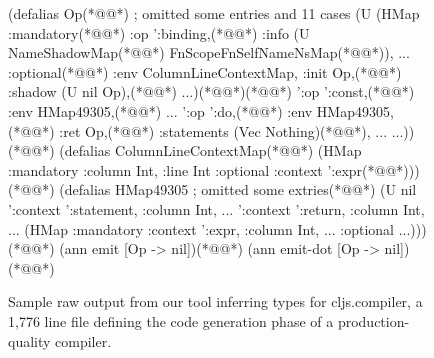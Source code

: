 \begin{figure}
\begin{cljlistingnumbered}
  (defalias Op(*@\label{infer:listing:cljs:Op}@*) ; omitted some entries and 11 cases
    (U (HMap :mandatory(*@\label{infer:listing:cljs:Op:op:bindingStart}@*)
             {:op ':binding,(*@\label{infer:listing:cljs:Op:op:binding}@*) :info (U NameShadowMap(*@\label{infer:listing:cljs:Op:op:binding:NameShadowMap}@*) FnScopeFnSelfNameNsMap(*@\label{infer:listing:cljs:Op:op:binding:FnScopeFnSelfNameNsMap}@*)), ...}
             :optional(*@\label{infer:listing:cljs:Op:optional}@*)
             {:env ColumnLineContextMap, :init Op,(*@\label{infer:listing:cljs:Op:optional:init:Op}@*) :shadow (U nil Op),(*@\label{infer:listing:cljs:Op:optional:shadow:Op}@*) ...})(*@\label{infer:listing:cljs:Op:optionalEnd}@*)(*@\label{infer:listing:cljs:Op:op:bindingEnd}@*)
      '{:op ':const,(*@\label{infer:listing:cljs:Op:op:const}@*) :env HMap49305,(*@\label{infer:listing:cljs:Op:op:const:HMap49305}@*) ...}
      '{:op ':do,(*@\label{infer:listing:cljs:Op:op:do}@*) :env HMap49305,(*@\label{infer:listing:cljs:Op:op:do:HMap49305}@*) :ret Op,(*@\label{infer:listing:cljs:Op:op:do:Op}@*) :statements (Vec Nothing)(*@\label{infer:listing:cljs:Op:op:do:statements}@*), ...}
      ...))(*@\label{infer:listing:cljs:Op-End}@*)
  (defalias ColumnLineContextMap(*@\label{infer:listing:cljs:ColumnLineContextMap}@*)
    (HMap :mandatory {:column Int, :line Int} :optional {:context ':expr}(*@\label{infer:listing:cljs:ColumnLineContextMap:optional}@*)))(*@\label{infer:listing:cljs:ColumnLineContextMapEnd}@*)
  (defalias HMap49305 ; omitted some extries(*@\label{infer:listing:cljs:HMap49305}@*)
    (U nil
       '{:context ':statement, :column Int, ...} '{:context ':return, :column Int, ...}
       (HMap :mandatory {:context ':expr, :column Int, ...} :optional {...})))(*@\label{infer:listing:cljs:HMap49305End}@*)
  (ann emit [Op -> nil])(*@\label{infer:listing:cljs:emit}@*)
  (ann emit-dot [Op -> nil])(*@\label{infer:listing:cljs:emit-dot}@*)
\end{cljlistingnumbered}
\caption{
         Sample raw output from our
         tool inferring types for cljs.compiler,
         a 1,776 line file defining the code generation phase of
         a production-quality compiler.
}
\end{figure}
